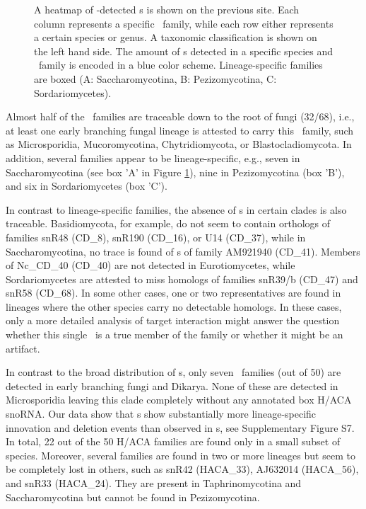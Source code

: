 \begin{figure}
  \caption{A heatmap of \snostrip-detected \cd s is shown on the
    previous site. Each column represents a specific \sno\ family,
    while each row either represents a certain species or genus. A
    taxonomic classification is shown on the left hand side. The
    amount of \sno s detected in a specific species and \sno\ family
    is encoded in a blue color scheme. Lineage-specific families are
    boxed (A: Saccharomycotina, B: Pezizomycotina, C:
    Sordariomycetes). %
  }
  \label{fig:heatmap_CD_snoRNAs} 
\end{figure}

Almost half of the \cd\ families are traceable down to the root of
fungi (32/68), i.e., at least one early branching fungal lineage is
attested to carry this \sno\ family, such as Microsporidia,
Mucoromycotina, Chytridiomycota, or Blastocladiomycota. In addition,
several families appear to be lineage-specific, e.g., seven in
Saccharomycotina (see box 'A' in Figure \ref{fig:heatmap_CD_snoRNAs}),
nine in Pezizomycotina (box 'B'), and six in Sordariomycetes (box
'C').

In contrast to lineage-specific families, the absence of \sno s in
certain clades is also traceable. Basidiomycota, for example, do not
seem to contain orthologs of families snR48 (CD\_8), snR190 (CD\_16),
or U14 (CD\_37), while in Saccharomycotina, no trace is found of \sno
s of family AM921940 (CD\_41). Members of Nc\_CD\_40 (CD\_40) are not
detected in Eurotiomycetes, while Sordariomycetes are attested to miss
homologs of families snR39/b (CD\_47) and snR58 (CD\_68). In some
other cases, one or two representatives are found in lineages where
the other species carry no detectable homologs. In these cases, only a
more detailed analysis of target interaction might answer the question
whether this single \sno\ is a true member of the family or whether it
might be an artifact.

In contrast to the broad distribution of \cd s, only seven \haca\
families (out of 50) are detected in early branching fungi and
Dikarya. None of these are detected in Microsporidia leaving this
clade completely without any annotated box H/ACA snoRNA. Our data show
that \haca s show substantially more lineage-specific innovation and
deletion events than observed in \cd s, see Supplementary Figure
S7. In total, 22 out of the 50 H/ACA families are found only in a
small subset of species. Moreover, several families are found in two
or more lineages but seem to be completely lost in others, such as
snR42 (HACA\_33), AJ632014 (HACA\_56), and snR33 (HACA\_24). They are
present in Taphrinomycotina and Saccharomycotina but cannot be found
in Pezizomycotina.

